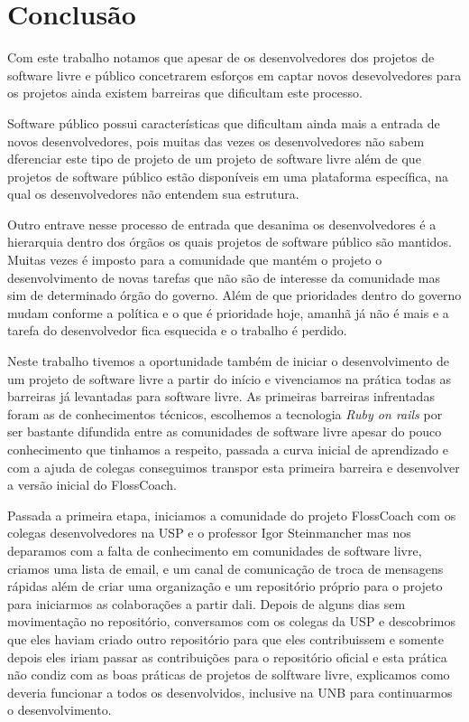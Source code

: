\chapter{Conclusão}
\label{conclusao}

Com este trabalho notamos que apesar de os desenvolvedores dos projetos de software
livre e público concetrarem esforços em captar novos desevolvedores para os 
projetos ainda existem barreiras que dificultam este processo. 

Software público possui características que dificultam ainda mais a entrada de 
novos desenvolvedores, pois muitas das vezes os desenvolvedores não sabem 
dferenciar este tipo de projeto de um projeto de software livre além de que
projetos de software público estão disponíveis em uma plataforma específica,
na qual os desenvolvedores não entendem sua estrutura.

Outro entrave nesse processo de entrada que desanima os desenvolvedores
é a hierarquia dentro dos órgãos os quais projetos de software público são 
mantidos. Muitas vezes é imposto para a comunidade que mantém o projeto
o desenvolvimento de novas tarefas que não são de interesse da comunidade
mas sim de determinado órgão do governo. Além de que prioridades dentro do
governo mudam conforme a política e o que é prioridade hoje, amanhã já não é mais
e a tarefa do desenvolvedor fica esquecida e o trabalho é perdido.

Neste trabalho tivemos a oportunidade também de iniciar o desenvolvimento de um
projeto de software livre a partir do início e vivenciamos na prática todas as barreiras
já levantadas para software livre. As primeiras barreiras infrentadas foram as de
conhecimentos técnicos, escolhemos a tecnologia \textit{Ruby on rails} por ser
bastante difundida entre as comunidades de software livre apesar do pouco conhecimento
que tinhamos a respeito, passada a curva inicial de aprendizado e com a ajuda de 
colegas conseguimos transpor esta primeira barreira e desenvolver a versão inicial 
do FlossCoach.

Passada a primeira etapa, iniciamos a comunidade do projeto FlossCoach com os colegas
desenvolvedores na USP e o professor Igor Steinmancher mas nos deparamos com a 
falta de conhecimento em comunidades de software livre, criamos uma lista de email,
e um canal de comunicação de troca de mensagens rápidas além de criar uma organização
e um repositório próprio para o projeto para iniciarmos as colaborações a partir dali.
Depois de alguns dias sem movimentação no repositório, conversamos com os colegas
da USP e descobrimos que eles haviam criado outro repositório para que eles contribuissem
e somente depois eles iriam passar as contribuições para o repositório oficial e esta
prática não condiz com as boas práticas de projetos de solftware livre, explicamos 
como deveria funcionar a todos os desenvolvidos, inclusive na UNB para continuarmos
o desenvolvimento.

